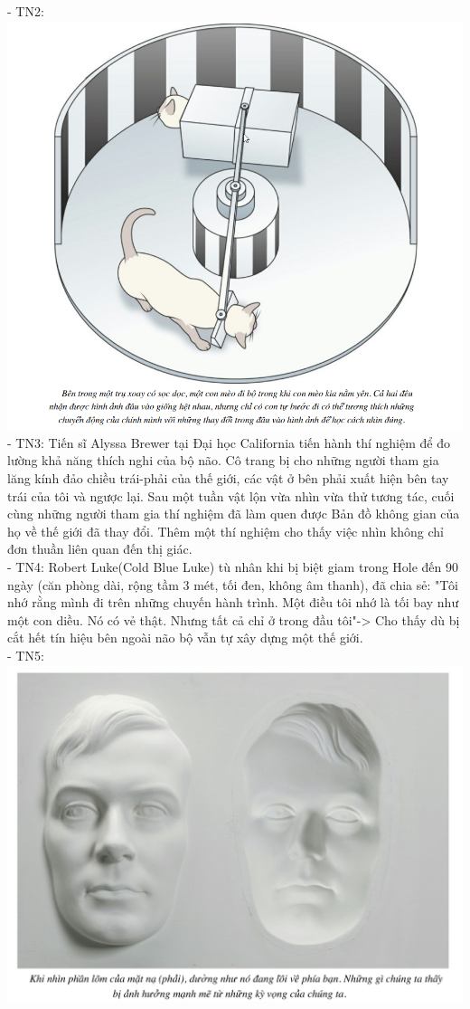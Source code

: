 \documentclass{article}
\newcommand\tab[1][1cm]{\hspace*{#1}}
\begin{document}
\tab\tab - TN2: \\
\includegraphics[width=\textwidth]{images/2024-07-30_13h08_25.png}
\tab\tab - TN3: Tiến sĩ Alyssa Brewer tại Đại học California tiến hành thí nghiệm để đo lường khả năng thích nghi của bộ não. 
Cô trang bị cho những người tham gia lăng kính đảo chiều trái-phải của thế giới, các vật ở bên phải xuất hiện bên tay trái của tôi và ngược lại. 
Sau một tuần vật lộn vừa nhìn vừa thử tương tác, cuối cùng những người tham gia thí nghiệm đã làm quen được
Bản đồ không gian của họ về thế giới đã thay đổi. Thêm một thí nghiệm cho thấy việc nhìn không chỉ đơn thuần 
liên quan đến thị giác.\\
\tab\tab - TN4: Robert Luke(Cold Blue Luke) tù nhân khi bị biệt giam trong Hole đến 90 ngày 
(căn phòng dài, rộng tầm 3 mét, tối đen, không âm thanh), đã chia sẻ: "Tôi nhớ rằng mình đi trên 
những chuyến hành trình. Một điều tôi nhớ là tối bay như một con diều. Nó có vẻ thật. Nhưng tất cả 
chỉ ở trong đầu tôi"-> Cho thấy dù bị cắt hết tín hiệu bên ngoài não bộ vẫn tự xây dựng một thế giới.\\
\tab\tab - TN5:\\
\includegraphics[width=\textwidth]{images/Screenshot 2024-07-30 194516.png}
\end{document}
